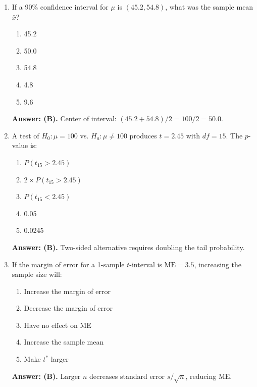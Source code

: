 \begin{enumerate}[leftmargin=1.5em]
  \item If a 90\% confidence interval for $\mu$ is $(45.2, 54.8)$, what was the sample mean $\bar{x}$?
  \begin{enumerate}[label=(\Alph*)]
    \item 45.2 \item 50.0 \item 54.8 \item 4.8 \item 9.6
  \end{enumerate}
  \textbf{Answer: (B).} Center of interval: $(45.2 + 54.8)/2 = 100/2 = 50.0$.

  \item A test of $H_0: \mu = 100$ vs. $H_a: \mu \neq 100$ produces $t = 2.45$ with $df = 15$. The $p$-value is:
  \begin{enumerate}[label=(\Alph*)]
    \item $P(t_{15} > 2.45)$ \item $2 \times P(t_{15} > 2.45)$ \item $P(t_{15} < 2.45)$ \item 0.05 \item 0.0245
  \end{enumerate}
  \textbf{Answer: (B).} Two-sided alternative requires doubling the tail probability.

  \item If the margin of error for a 1-sample $t$-interval is $\text{ME} = 3.5$, increasing the sample size will:
  \begin{enumerate}[label=(\Alph*)]
    \item Increase the margin of error \item Decrease the margin of error \item Have no effect on ME \item Increase the sample mean \item Make $t^*$ larger
  \end{enumerate}
  \textbf{Answer: (B).} Larger $n$ decreases standard error $s/\sqrt{n}$, reducing ME.
\end{enumerate}

